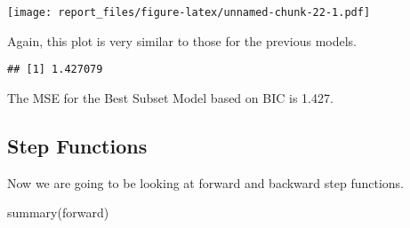 \documentclass[
]{article}
\newenvironment{Shaded}{\begin{snugshade}}{\end{snugshade}}
\newcommand{\AttributeTok}[1]{\textcolor[rgb]{0.77,0.63,0.00}{#1}}
\newcommand{\DecValTok}[1]{\textcolor[rgb]{0.00,0.00,0.81}{#1}}
\newcommand{\FunctionTok}[1]{\textcolor[rgb]{0.00,0.00,0.00}{#1}}
\newcommand{\NormalTok}[1]{#1}
\newcommand{\OtherTok}[1]{\textcolor[rgb]{0.56,0.35,0.01}{#1}}
\newcommand{\SpecialCharTok}[1]{\textcolor[rgb]{0.00,0.00,0.00}{#1}}
\newcommand{\StringTok}[1]{\textcolor[rgb]{0.31,0.60,0.02}{#1}}
\begin{document}
\begin{Shaded}
\end{Shaded}

\texttt{[image: report\_files/figure-latex/unnamed-chunk-22-1.pdf]}

Again, this plot is very similar to those for the previous models.

\begin{Shaded}
\end{Shaded}

\begin{verbatim}
## [1] 1.427079
\end{verbatim}

The MSE for the Best Subset Model based on BIC is 1.427.

\hypertarget{step-functions}{%
\subsection{Step Functions}\label{step-functions}}

Now we are going to be looking at forward and backward step functions.

\begin{Shaded}
\begin{Highlighting}[]
\FunctionTok{summary}\NormalTok{(forward)}
\end{Highlighting}
\end{Shaded}
\end{document}
